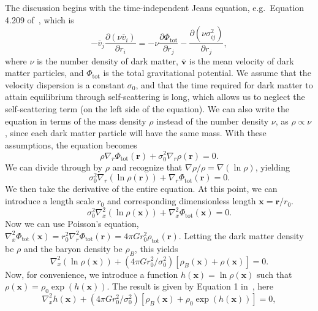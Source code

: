 The discussion begins with the time-independent Jeans equation, e.g.~Equation
4.209 of~\cite{binney_galactic_2008}, which is 
\begin{equation}
    - \overline{v}_j \frac{\partial (\nu \overline{v}_i)}{\partial r_i} 
    = - \nu \frac{\partial \Phi_{\text{tot}}}{\partial r_j} 
    - \frac{\partial (\nu \sigma_{ij}^2)}{\partial r_j},
\end{equation}
where $\nu$ is the number density of dark matter, $\overline{\mathbf{v}}$ is
the mean velocity of dark matter particles, and $\Phi_{\text{tot}}$ is the
total gravitational potential.  We assume that the velocity dispersion is a
constant $\sigma_0$, and that the time required for dark matter to attain
equilibrium through self-scattering is long, which allows us to neglect the
self-scattering term (on the left side of the equation).  We can also write
the equation in terms of the mass density $\rho$ instead of the number density
$\nu$, as $\rho \propto \nu$, since each dark matter particle will have the
same mass.  With these assumptions, the equation becomes
\begin{equation}
    \rho \nabla_r \Phi_{\text{tot}}(\mathbf{r}) + \sigma_0^2 \nabla_r
    \rho(\mathbf{r}) = 0.
\end{equation}
We can divide through by $\rho$ and recognize that $\nabla \rho / \rho = \nabla
(\ln \rho)$, yielding 
\begin{equation}
    \sigma_0^2 \nabla_r (\ln \rho(\mathbf{r})) + \nabla_r
    \Phi_{\text{tot}}(\mathbf{r}) = 0.
\end{equation}
We then take the derivative of the entire equation.  At this point, we can
introduce a length scale $r_0$ and corresponding dimensionless length
$\mathbf{x} = \mathbf{r} / r_0$.
\begin{equation}
    \sigma_0^2 \nabla_x^2 (\ln \rho(\mathbf{x})) + \nabla_x^2
    \Phi_{\text{tot}}(\mathbf{x}) = 0.
\end{equation}
Now we can use Poisson's equation, $\nabla_x^2 \Phi_{\text{tot}}(\mathbf{x}) =
r_0^2 \nabla_r^2 \Phi_{\text{tot}}(\mathbf{r}) = 4 \pi G r_0^2
\rho_{\text{tot}}(\mathbf{r})$.  Letting the dark matter density be $\rho$ and
the baryon density be $\rho_B$, this yields
\begin{equation}
    \nabla_x^2 (\ln \rho(\mathbf{x})) + (4 \pi G r_0^2/\sigma_0^2) \left[ \rho_B (\mathbf{x}) + \rho(\mathbf{x}) \right] = 0.
\end{equation}
Now, for convenience, we introduce a function $h(\mathbf{x}) = \ln
\rho(\mathbf{x})$ such that $\rho(\mathbf{x}) = \rho_0 \exp(h(\mathbf{x}))$.
The result is given by Equation 1 in~\cite{kaplinghat_tying_2014}, here
\begin{equation}
\nabla_x^2 h(\mathbf{x}) + (4\pi G r_0^2/\sigma_0^2)
\left[\rho_B(\mathbf{x}) + \rho_0 \exp\left(h(\mathbf{x})\right)\right] = 0,
\end{equation}

